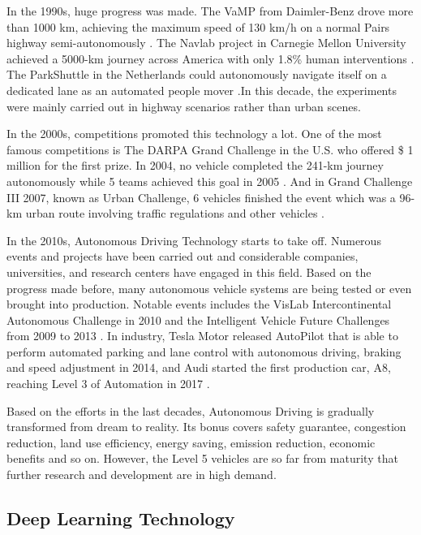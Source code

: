\documentclass[a4paper,12pt]{article}
\begin{document}
In the 1990s, huge progress was made. The VaMP from Daimler-Benz drove more than 1000 km, achieving the maximum speed of 130 km/h on a normal Pairs highway semi-autonomously \cite{schj}. The Navlab project in Carnegie Mellon University achieved a 5000-km journey across America with only 1.8\% human interventions \cite{nohand}. The ParkShuttle in the Netherlands could autonomously navigate itself on a dedicated lane as an automated people mover \cite{parkshuttle}.In this decade, the experiments were mainly carried out in highway scenarios rather than urban scenes.

In the 2000s, competitions promoted this technology a lot. One of the most famous competitions is The DARPA Grand Challenge in the U.S. who offered \$ 1 million for the first prize. In 2004, no vehicle completed the 241-km journey autonomously while 5 teams achieved this goal in 2005 \cite{Buehler2007}. And in Grand Challenge III 2007, known as Urban Challenge, 6 vehicles  finished the event which was a 96-km urban route involving traffic regulations and other vehicles \cite{Buehler2009}.

In the 2010s,  Autonomous Driving Technology starts to take off. Numerous events and projects have been carried out and considerable companies, universities, and research centers have engaged in this field. Based on the progress made before, many autonomous vehicle systems are being tested or even brought into production.  Notable events includes the VisLab Intercontinental Autonomous Challenge in 2010 \cite{doi:10.1504/IJVAS.2012.051250} and the Intelligent Vehicle Future  Challenges from 2009 to 2013 \cite{newlet00}. In industry, Tesla Motor released AutoPilot  that is able to perform automated parking and lane control with autonomous driving, braking and speed adjustment in 2014, and  Audi started the first production car, A8,  reaching Level 3 of Automation in 2017 \cite{historyad}.

Based on the efforts in the last decades, Autonomous Driving is gradually transformed from dream to reality. Its bonus covers safety guarantee, congestion reduction, land use efficiency, energy saving, emission reduction, economic benefits and so on. However, the Level 5 vehicles are so far from maturity that further research and development are in high demand.

\clearpage

\subsection{Deep Learning Technology}
\label{dlt}
\end{document}

